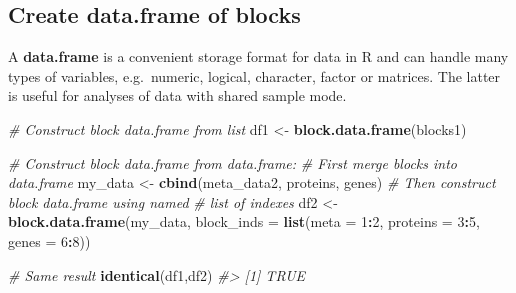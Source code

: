 \documentclass[
]{article}
\newenvironment{Shaded}{\begin{snugshade}}{\end{snugshade}}
\newcommand{\AttributeTok}[1]{\textcolor[rgb]{0.13,0.29,0.53}{#1}}
\newcommand{\CommentTok}[1]{\textcolor[rgb]{0.56,0.35,0.01}{\textit{#1}}}
\newcommand{\DecValTok}[1]{\textcolor[rgb]{0.00,0.00,0.81}{#1}}
\newcommand{\FunctionTok}[1]{\textcolor[rgb]{0.13,0.29,0.53}{\textbf{#1}}}
\newcommand{\NormalTok}[1]{#1}
\newcommand{\OtherTok}[1]{\textcolor[rgb]{0.56,0.35,0.01}{#1}}
\newcommand{\SpecialCharTok}[1]{\textcolor[rgb]{0.81,0.36,0.00}{\textbf{#1}}}
\begin{document}
\subsection{Create data.frame of
blocks}\label{create-data.frame-of-blocks}

A \textbf{data.frame} is a convenient storage format for data in R and
can handle many types of variables, e.g.~numeric, logical, character,
factor or matrices. The latter is useful for analyses of data with
shared sample mode.

\begin{Shaded}
\begin{Highlighting}[]
\CommentTok{\# Construct block data.frame from list}
\NormalTok{df1 }\OtherTok{\textless{}{-}} \FunctionTok{block.data.frame}\NormalTok{(blocks1)}

\CommentTok{\# Construct block data.frame from data.frame:}
\CommentTok{\# First merge blocks into data.frame}
\NormalTok{my\_data }\OtherTok{\textless{}{-}} \FunctionTok{cbind}\NormalTok{(meta\_data2, proteins, genes)}
\CommentTok{\# Then construct block data.frame using named }
\CommentTok{\# list of indexes}
\NormalTok{df2 }\OtherTok{\textless{}{-}} \FunctionTok{block.data.frame}\NormalTok{(my\_data, }\AttributeTok{block\_inds =} 
        \FunctionTok{list}\NormalTok{(}\AttributeTok{meta =} \DecValTok{1}\SpecialCharTok{:}\DecValTok{2}\NormalTok{, }\AttributeTok{proteins =} \DecValTok{3}\SpecialCharTok{:}\DecValTok{5}\NormalTok{, }\AttributeTok{genes =} \DecValTok{6}\SpecialCharTok{:}\DecValTok{8}\NormalTok{))}

\CommentTok{\# Same result}
\FunctionTok{identical}\NormalTok{(df1,df2)}
\CommentTok{\#\textgreater{} [1] TRUE}


\end{Highlighting}
\end{Shaded}
\end{document}
